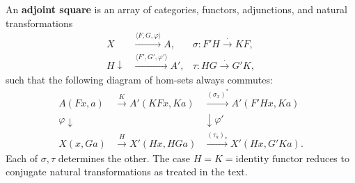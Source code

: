 An \textbf{adjoint square} is an array of categories, functors, adjunctions, and natural transformations
$$\begin{array}{ccc}
X & \xrightarrow{\langle F, G, \varphi \rangle} A, & \sigma : F'H \xrightarrow{\cdot} KF, \\[4pt]
H \downarrow & \xrightarrow{\langle F', G', \varphi' \rangle} A', & \tau : HG \xrightarrow{\cdot} G'K,
\end{array}$$
such that the following diagram of hom-sets always commutes:
$$\begin{array}{ccc}
A(Fx, a) & \xrightarrow{K} A'(KFx, Ka) & \xrightarrow{(\sigma_x)^*} A'(F'Hx, Ka) \\[4pt]
\varphi \downarrow & & \downarrow \varphi' \\[4pt]
X(x, Ga) & \xrightarrow{H} X'(Hx, HGa) & \xrightarrow{(\tau_a)_*} X'(Hx, G'Ka).
\end{array}$$
Each of $\sigma, \tau$ determines the other. The case $H = K = \text{identity functor}$ reduces to conjugate natural transformations as treated in the text.
